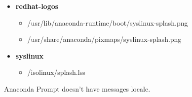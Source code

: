 
\begin{itemize}

\item \textbf{redhat-logos}

\begin{itemize}
\item /usr/lib/anaconda-runtime/boot/syslinux-splash.png
\item /usr/share/anaconda/pixmaps/syslinux-splash.png
\end{itemize}

\item \textbf{syslinux}

\begin{itemize}
\item /isolinux/splash.lss
\end{itemize}
\end{itemize}

Anaconda Prompt doesn't have messages locale. 

